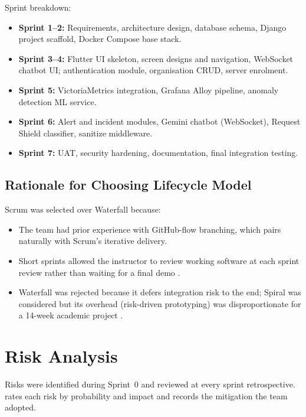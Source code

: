 Sprint breakdown:
\begin{itemize}
  \item \textbf{Sprint 1--2:} Requirements, architecture design, database schema,
        Django project scaffold, Docker Compose base stack.
  \item \textbf{Sprint 3--4:} Flutter UI skeleton, screen designs and navigation,
        WebSocket chatbot UI; authentication module, organisation CRUD, server enrolment.
  \item \textbf{Sprint 5:} VictoriaMetrics integration, Grafana Alloy pipeline,
        anomaly detection ML service.
  \item \textbf{Sprint 6:} Alert and incident modules, Gemini chatbot (WebSocket),
        Request Shield classifier, sanitize middleware.
  \item \textbf{Sprint 7:} UAT, security hardening, documentation, final integration testing.
\end{itemize}

\subsection{Rationale for Choosing Lifecycle Model}

Scrum was selected over Waterfall because:
\begin{itemize}
  \item The team had prior experience with GitHub-flow branching, which pairs
        naturally with Scrum's iterative delivery.
  \item Short sprints allowed the instructor to review working software at each
        sprint review rather than waiting for a final demo \cite{pressman2019}.
  \item Waterfall was rejected because it defers integration risk to the end;
        Spiral was considered but its overhead (risk-driven prototyping) was
        disproportionate for a 14-week academic project \cite{sommerville2016}.
\end{itemize}

\section{Risk Analysis}

Risks were identified during Sprint~0 and reviewed at every sprint
retrospective.   rates each risk by probability and impact
and records the mitigation the team adopted.

